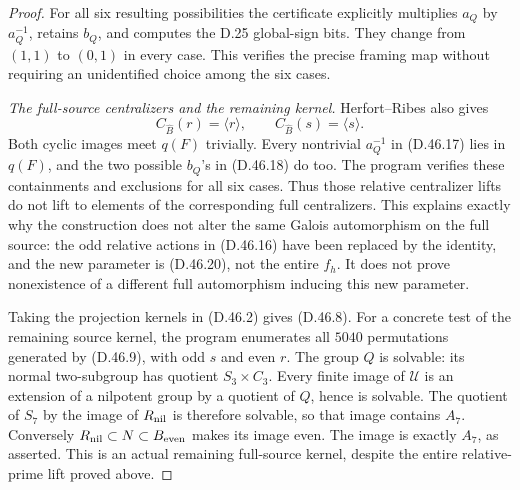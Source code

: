 \begin{proof}
For all six resulting
possibilities the
certificate explicitly
multiplies \(a_Q\)
by \(a_Q^{-1}\),
retains \(b_Q\), and
computes the D.25
global-sign bits.
They change from
\((1,1)\) to
\((0,1)\) in every
case. This verifies
the precise framing
map without requiring
an unidentified choice
among the six cases.

\emph{The full-source centralizers and the remaining kernel.}
Herfort--Ribes
\cite[Theorem B$'$]{A_HerfortRibes1985}
also gives
\[
 C_{\widehat B}(r)=\langle r\rangle,\qquad
 C_{\widehat B}(s)=\langle s\rangle.                            \tag{D.46.23}
\]
Both cyclic images
meet \(q(F)\)
trivially. Every
nontrivial \(a_Q^{-1}\)
in (D.46.17) lies
in \(q(F)\), and
the two possible
\(b_Q\)'s in
(D.46.18) do too.
The program verifies
these containments
and exclusions for
all six cases.
Thus those relative
centralizer lifts
do not lift to
elements of the
corresponding full
centralizers.
This explains exactly
why the construction
does not alter the
same Galois automorphism
on the full source:
the odd relative
actions in
(D.46.16) have been
replaced by the
identity, and the
new parameter is
(D.46.20), not the
entire \(f_h\).
It does not prove
nonexistence of a
different full
automorphism inducing
this new parameter.

Taking the projection
kernels in (D.46.2)
gives (D.46.8).
For a concrete test
of the remaining
source kernel, the
program enumerates
all \(5040\)
permutations generated
by (D.46.9), with
odd \(s\) and even
\(r\).
The group \(Q\) is
solvable: its normal
two-subgroup has
quotient \(S_3\times C_3\).
Every finite image
of \(\mathcal U\)
is an extension of
a nilpotent group
by a quotient of
\(Q\), hence is
solvable.
The quotient of
\(S_7\) by the
image of
\(R_{\rm nil}\)
is therefore
solvable, so that
image contains
\(A_7\). Conversely
\(R_{\rm nil}\subset N
\subset B_{\rm even}\)
makes its image
even. The image
is exactly \(A_7\),
as asserted. This
is an actual
remaining full-source
kernel, despite the
entire relative-prime
lift proved above.
\end{proof}
